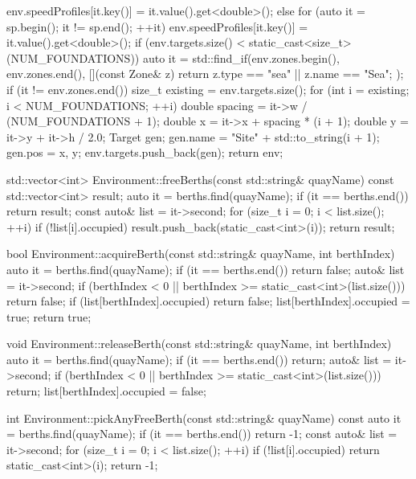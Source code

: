 \documentclass[10pt,letterpaper]{jsarticle}
\begin{document}
\begin{cppcode}
{{{{{                    env.speedProfiles[it.key()] = it.value().get<double>();
                }
            }
        } else {
            for (auto it = sp.begin(); it != sp.end(); ++it) {
                env.speedProfiles[it.key()] = it.value().get<double>();
            }
        }
    }
    if (env.targets.size() < static_cast<size_t>(NUM_FOUNDATIONS)) {
        auto it = std::find_if(env.zones.begin(), env.zones.end(), [](const Zone& z) {
            return z.type == "sea" || z.name == "Sea";
        });
        if (it != env.zones.end()) {
            size_t existing = env.targets.size();
            for (int i = existing; i < NUM_FOUNDATIONS; ++i) {
                double spacing = it->w / (NUM_FOUNDATIONS + 1);
                double x = it->x + spacing * (i + 1);
                double y = it->y + it->h / 2.0;
                Target gen;
                gen.name = "Site" + std::to_string(i + 1);
                gen.pos = {x, y};
                env.targets.push_back(gen);
            }
        }
    }
    return env;
}

std::vector<int> Environment::freeBerths(const std::string& quayName) const {
    std::vector<int> result;
    auto it = berths.find(quayName);
    if (it == berths.end()) return result;
    const auto& list = it->second;
    for (size_t i = 0; i < list.size(); ++i) {
        if (!list[i].occupied) result.push_back(static_cast<int>(i));
    }
    return result;
}

bool Environment::acquireBerth(const std::string& quayName, int berthIndex) {
    auto it = berths.find(quayName);
    if (it == berths.end()) return false;
    auto& list = it->second;
    if (berthIndex < 0 || berthIndex >= static_cast<int>(list.size())) return false;
    if (list[berthIndex].occupied) return false;
    list[berthIndex].occupied = true;
    return true;
}

void Environment::releaseBerth(const std::string& quayName, int berthIndex) {
    auto it = berths.find(quayName);
    if (it == berths.end()) return;
    auto& list = it->second;
    if (berthIndex < 0 || berthIndex >= static_cast<int>(list.size())) return;
    list[berthIndex].occupied = false;
}

int Environment::pickAnyFreeBerth(const std::string& quayName) const {
    auto it = berths.find(quayName);
    if (it == berths.end()) return -1;
    const auto& list = it->second;
    for (size_t i = 0; i < list.size(); ++i) {
        if (!list[i].occupied) return static_cast<int>(i);
    }
    return -1;
}


\end{cppcode}
\end{document}
